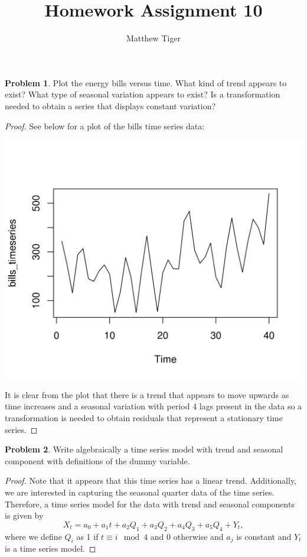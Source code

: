 \documentclass[12pt]{article}
\title{Homework Assignment 10}
\author{Matthew Tiger}
\theoremstyle{definition}
\newtheorem{problem}{Problem}
\begin{document}
\maketitle


\begin{problem}
  Plot the energy bills versus time. What kind of trend appears to exist? What type of seasonal
  variation appears to exist? Is a transformation needed to obtain a series that displays constant
  variation?
\end{problem}

\begin{proof}
  See below for a plot of the bills time series data:
  \vskip 0mm
  \begin{center}
  \includegraphics{timeseries}
  \end{center}
  \vskip 10mm

  It is clear from the plot that there is a trend that appears to move upwards
  as time increases and a seasonal variation with period 4
  lags present in the data so a transformation is needed to obtain residuals
  that represent a stationary time series.
\end{proof}


\begin{problem}
  Write algebraically a time series model with trend and seasonal component with definitions
  of the dummy variable.
\end{problem}

\begin{proof}
  Note that it appears that this time series has a linear trend. Additionally,
  we are interested in capturing the seasonal quarter data of the time series.
  Therefore, a time series model for the data with trend and seasonal components is given by
  \[
    X_t = a_0 + a_1 t + a_2 Q_1 + a_3 Q_2 + a_4 Q_3 + a_5 Q_4 + Y_t,
  \]
  where we define $Q_i$ as 1 if $t \equiv i \mod 4$ and 0 otherwise and $a_j$ is
  constant and $Y_t$ is a time series model.
\end{proof}
\end{document}
